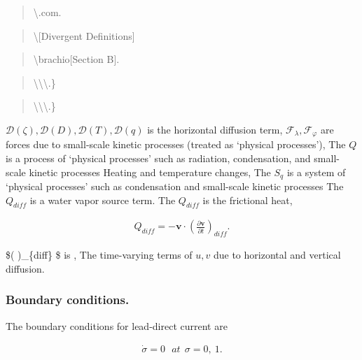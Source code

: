 \begin{quote}
\textbackslash{}\blade.com.
\end{quote}

\begin{quote}
\protect\hypertarget{Divergentux20Definitions}{}{\textbackslash{[}Divergent
Definitions{]}}
\end{quote}

\begin{quote}
\protect\hypertarget{Sectionux20B}{}{\textbackslash brachio{[}Section
B{]}}.
\end{quote}

\begin{quote}
\protect\hypertarget{Sectionux20A}{}{\textbackslash\textbackslash\textbackslash.\}
}
\end{quote}

\begin{quote}
\textbackslash\textbackslash\textbackslash.\}
\end{quote}

\({\mathcal D}(\zeta), {\mathcal D}(D), {\mathcal D}(T), {\mathcal D}(q)\)
is the horizontal diffusion term,
\({\mathcal F}_\lambda, {\mathcal F}_\varphi\) are forces due to
small-scale kinetic processes (treated as `physical processes'), The
\(Q\) is a process of `physical processes' such as radiation,
condensation, and small-scale kinetic processes Heating and temperature
changes, The \(S_q\) is a system of `physical processes' such as
condensation and small-scale kinetic processes The \(Q_{diff}\) is a
water vapor source term. The \(Q_{diff}\) is the frictional heat,

\begin{eqnarray}
  Q_{diff}
 = - \mathbf{v} \cdot  ( \frac{\partial \mathbf{v}}{\partial t} )_{diff} .
\end{eqnarray}

\$(  )\_\{diff\} \$ is , The
time-varying terms of \(u,v\) due to horizontal and vertical diffusion.

\hypertarget{boundary-conditions.}{%
\subsubsection{Boundary conditions.}\label{boundary-conditions.}}

The boundary conditions for lead-direct current are

\begin{eqnarray}
  \dot{\sigma} = 0  \ \ \ at \ \ \sigma = 0 , \ 1 .
\end{eqnarray}

